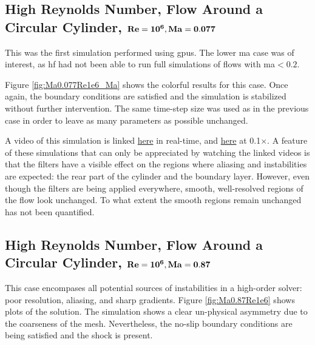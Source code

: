 \subsection{High Reynolds Number, Flow Around a Circular Cylinder, $\bf Re = 10^6, Ma = 0.077$}
This was the first simulation performed using \gls{gpu}s. The lower \gls{ma} case was of interest, as \gls{hf} had not been able to run full simulations of flows with \gls{ma}$< 0.2$.

Figure \ref{fig:Ma0.077Re1e6_Ma} shows the colorful results for this case. Once again, the boundary conditions are satisfied and the simulation is stabilized without further intervention. The same time-step size was used as in the previous case in order to leave as many parameters as possible unchanged.

A video of this simulation is linked \href{https://youtu.be/EymTVFzyPcA}{here} in real-time, and \href{https://youtu.be/8ZH349_GRUA}{here} at 0.1$\times$. A feature of these simulations that can only be appreciated by watching the linked videos is that the filters have a visible effect on the regions where aliasing and instabilities are expected: the rear part of the cylinder and the boundary layer. However, even though the filters are being applied everywhere, smooth, well-resolved regions of the flow look unchanged. To what extent the smooth regions remain unchanged has not been quantified.

\begin{figure*}
\hspace{-1cm}
\hfill
{}
\caption{Flow past a cylinder. \gls{re}$= 1e6$, \gls{ma} $= 0.077, p = 4$}
\label{fig:Ma0.077Re1e6_Ma}

\end{figure*}

%

\subsection{High Reynolds Number, Flow Around a Circular Cylinder, $\bf Re = 10^6, Ma = 0.87$}

This case encompases all potential sources of instabilities in a high-order solver: poor resolution, aliasing, and sharp gradients. Figure \ref{fig:Ma0.87Re1e6} shows plots of the solution. The simulation shows a clear un-physical asymmetry due to the coarseness of the mesh. Nevertheless, the no-slip boundary conditions are being satisfied and the shock is present. 

